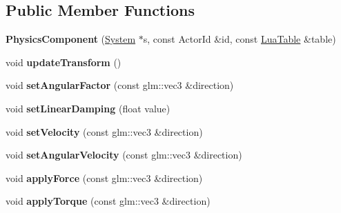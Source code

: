 \subsection*{Public Member Functions}
\begin{DoxyCompactItemize}
\item 
\mbox{\label{classTarbora_1_1PhysicsComponent_adcd3fe64e2bc064de0a6892f4d102b99}} 
{\bfseries Physics\+Component} (\hyperlink{classTarbora_1_1System}{System} $\ast$s, const Actor\+Id \&id, const \hyperlink{classTarbora_1_1LuaTable}{Lua\+Table} \&table)
\item 
\mbox{\label{classTarbora_1_1PhysicsComponent_a8874d33c4a057f8cc511c9a51cf34d38}} 
void {\bfseries update\+Transform} ()
\item 
\mbox{\label{classTarbora_1_1PhysicsComponent_ac3f872ede813fed363bdc33b25299a54}} 
void {\bfseries set\+Angular\+Factor} (const glm\+::vec3 \&direction)
\item 
\mbox{\label{classTarbora_1_1PhysicsComponent_ab3b5bc3c5be6f23b660aa7436ace3551}} 
void {\bfseries set\+Linear\+Damping} (float value)
\item 
\mbox{\label{classTarbora_1_1PhysicsComponent_ace3b5c0be5b1591ebd42beae7f262555}} 
void {\bfseries set\+Velocity} (const glm\+::vec3 \&direction)
\item 
\mbox{\label{classTarbora_1_1PhysicsComponent_ad6f45e2f3430f2f7291aee8345502cd1}} 
void {\bfseries set\+Angular\+Velocity} (const glm\+::vec3 \&direction)
\item 
\mbox{\label{classTarbora_1_1PhysicsComponent_a79b71671292aacad7a70091f60eb0705}} 
void {\bfseries apply\+Force} (const glm\+::vec3 \&direction)
\item 
\mbox{\label{classTarbora_1_1PhysicsComponent_a939807ea8611effbe26f099a6625a4a6}} 
void {\bfseries apply\+Torque} (const glm\+::vec3 \&direction)
\item 
\mbox{\label{classTarbora_1_1PhysicsComponent_a8222600edf6ea348ca313108d6fab96c}} 

\end{DoxyCompactItemize}

